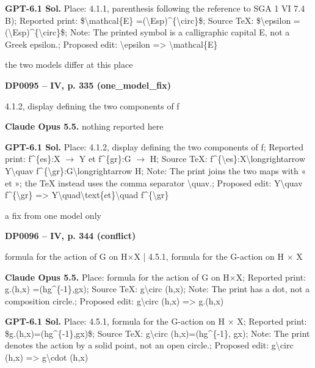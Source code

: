 \textbf{GPT-6.1 Sol.} Place: 4.1.1, parenthesis following the reference to SGA 1 VI 7.4 B); Reported print: \$\textbackslash{}mathcal\{E\} =\allowbreak  (\textbackslash{}Esp)\textasciicircum{}\{\textbackslash{}circ\}\$; Source TeX: \$\textbackslash{}epsilon =\allowbreak  (\textbackslash{}Esp)\textasciicircum{}\{\textbackslash{}circ\}\$; Note: The printed symbol is a calligraphic capital E, not a Greek epsilon.; Proposed edit: \textbackslash{}epsilon =\allowbreak > \textbackslash{}mathcal\{E\}\par
the two models differ at this place\par
\par\noindent\hypertarget{DP0095}{}\textbf{DP0095 -- IV, p. 335 (one\_model\_fix)}\par
4.1.2, display defining the two components of f\par
\textbf{Claude Opus 5.5.} nothing reported here\par
\textbf{GPT-6.1 Sol.} Place: 4.1.2, display defining the two components of f; Reported print: f\textasciicircum{}\{es\}:X \ensuremath{\to} Y et f\textasciicircum{}\{gr\}:G \ensuremath{\to} H; Source TeX: f\textasciicircum{}\{\textbackslash{}es\}:X\textbackslash{}longrightarrow Y\textbackslash{}quav f\textasciicircum{}\{\textbackslash{}gr\}:G\textbackslash{}longrightarrow H; Note: The print joins the two maps with « et »; the TeX instead uses the comma separator \textbackslash{}quav.; Proposed edit: Y\textbackslash{}quav f\textasciicircum{}\{\textbackslash{}gr\} =\allowbreak > Y\textbackslash{}quad\textbackslash{}text\{et\}\textbackslash{}quad f\textasciicircum{}\{\textbackslash{}gr\}\par
a fix from one model only\par
\par\noindent\hypertarget{DP0096}{}\textbf{DP0096 -- IV, p. 344 (conflict)}\par
formula for the action of G on H\ensuremath{\times}X | 4.5.1, formula for the G-action on H \ensuremath{\times} X\par
\textbf{Claude Opus 5.5.} Place: formula for the action of G on H\ensuremath{\times}X; Reported print: g.(h,x) =\allowbreak  (hg\textasciicircum{}\{-1\},gx); Source TeX: g\textbackslash{}circ (h,x); Note: The print has a dot, not a composition circle.; Proposed edit: g\textbackslash{}circ (h,x) =\allowbreak > g.(h,x)\par
\textbf{GPT-6.1 Sol.} Place: 4.5.1, formula for the G-action on H \ensuremath{\times} X; Reported print: \$g.(h,x)=\allowbreak (hg\textasciicircum{}\{-1\},gx)\$; Source TeX: g\textbackslash{}circ (h,x)=\allowbreak (hg\textasciicircum{}\{-1\}, gx); Note: The print denotes the action by a solid point, not an open circle.; Proposed edit: g\textbackslash{}circ (h,x) =\allowbreak > g\textbackslash{}cdot (h,x)\par
